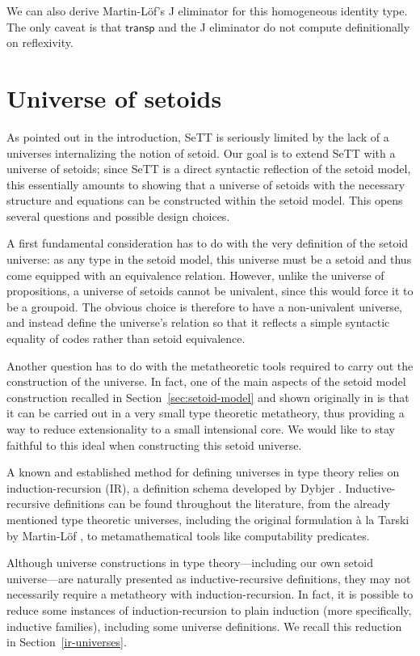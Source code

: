 \documentclass[autoref]{llncs}
\begin{document}
We can also derive Martin-L\"of's J eliminator for this homogeneous identity
type. The only caveat is that $\textsf{transp}$ and the J eliminator do not
compute definitionally on reflexivity.

\section{Universe of setoids}\label{setoid-universe}

As pointed out in the introduction, SeTT is seriously limited by the lack of a
universes internalizing the notion of setoid. Our goal is to extend SeTT with a
universe of setoids; since SeTT is a direct syntactic reflection of the setoid
model, this essentially amounts to showing that a universe of setoids with the
necessary structure and equations can be constructed within the setoid
model. This opens several questions and possible design choices.

A first fundamental consideration has to do with the very definition of the setoid
universe: as any type in the setoid model, this universe must be a setoid and
thus come equipped with an equivalence relation. However, unlike the universe of
propositions, a universe of setoids cannot be univalent, since this would force
it to be a groupoid. The obvious choice is therefore to have a non-univalent
universe, and instead define the universe's relation so that it reflects a
simple syntactic equality of codes rather than setoid equivalence.

Another question has to do with the metatheoretic tools required to carry out
the construction of the universe. In fact, one of the main aspects of the setoid
model construction recalled in Section~\ref{sec:setoid-model} and shown originally
in \cite{setoid99} is that it can be carried out in a very small type theoretic
metatheory, thus providing a way to reduce extensionality to a small intensional
core.
%
We would like to stay faithful to this ideal when constructing this setoid
universe.

A known and established method for defining universes in type theory relies on
induction-recursion (IR), a definition schema developed by Dybjer
\cite{ir-dybjer,dybjer-setzer}. Inductive-recursive definitions can be found
throughout the literature, from the already mentioned type theoretic universes,
including the original formulation \`{a} la Tarski by Martin-L\"of
\cite{libretto}, to metamathematical tools like computability predicates.

Although universe constructions in type theory---including our own setoid
universe---are naturally presented as inductive-recursive definitions, they may
not necessarily require a metatheory with induction-recursion. In fact, it is
possible to reduce some instances of induction-recursion to plain induction
(more specifically, inductive families), including some universe definitions. We
recall this reduction in Section~\ref{ir-universes}.
\end{document}
